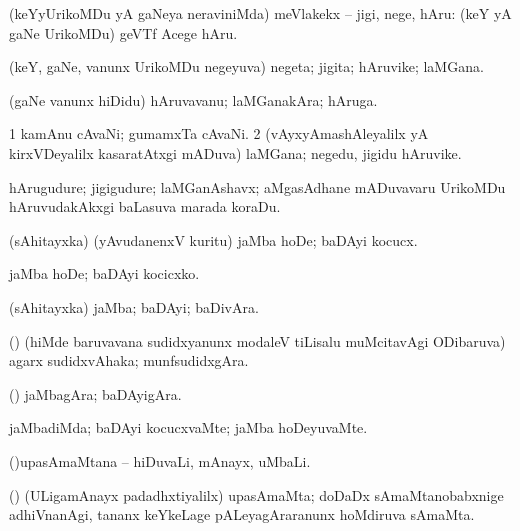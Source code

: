 \noindent 
\gl{\akirx}
\expl{}
\bmng
(keYyUrikoMDu yA gaNeya neraviniMda) meVlakekx -- jigi, nege, hAru:  (keY yA gaNe UrikoMDu) geVTf Acege hAru. 
\emng
\eentry

\bentry
{} 
\gl{\nA}
\expl{}
\bmng
 (keY, gaNe, \mo vanunx UrikoMDu negeyuva) negeta; jigita; hAruvike; laMGana. 
\emng
\eentry

\bentry
{} 
\gl{\nA}
\expl{}
\bmng
 (gaNe \mo vanunx hiDidu) hAruvavanu; laMGanakAra; hAruga. 
\emng
\eentry

\bentry
{} 
\gl{\nA}
\expl{}
\bmng
\bnum
\num{1} kamAnu cAvaNi; gumamxTa cAvaNi. 
\num{2} (vAyxyAmashAleyalilx yA kirxVDeyalilx kasaratAtxgi mADuva) laMGana; negedu, jigidu hAruvike. 
\enum
\emng
\eentry

\bentry
{} 
\gl{\nA}
\expl{}
\bmng
 hArugudure; jigigudure; laMGanAshavx; aMgasAdhane mADuvavaru UrikoMDu hAruvudakAkxgi baLasuva marada koraDu. 
\emng
\eentry

\bentry
{} 
\gl{\sakirx}
\expl{}
\bmng
 (sAhitayxka) (yAvudanenxV kuritu) jaMba hoDe; baDAyi kocucx. 
\emng

\noindent 
\gl{\akirx}
\expl{}
\bmng
 jaMba hoDe; baDAyi kocicxko. 
\emng
\eentry

\bentry
{} 
\gl{\nA}
\expl{}
\bmng
 (sAhitayxka) jaMba; baDAyi; baDivAra. 
\emng
\eentry

\bentry
{} 
\gl{\nA}
\expl{}
\bmng
(\pArxparx) (hiMde baruvavana sudidxyanunx modaleV tiLisalu muMcitavAgi ODibaruva) agarx sudidxvAhaka; munfsudidxgAra. 
\emng
\eentry

\bentry
{} 
\gl{\nA}
\expl{}
\bmng
(\pArxparx) jaMbagAra; baDAyigAra. 
\emng
\eentry

\bentry
{} 
\gl{\kirxvi}
\expl{}
\bmng
 jaMbadiMda; baDAyi kocucxvaMte; jaMba hoDeyuvaMte. 
\emng
\eentry

\bentry
{} 
\gl{\nA}
\bmng
 (\ca)upasAmaMtana -- hiDuvaLi, mAnayx, uMbaLi. 
\emng
\eentry

\bentry
{} 
\gl{\nA}
\expl{}
(\ca) \bmng
 (ULigamAnayx padadhxtiyalilx) upasAmaMta; doDaDx sAmaMtanobabxnige adhiVnanAgi, tananx keYkeLage pALeyagAraranunx hoMdiruva sAmaMta. 
\emng
\eentry

